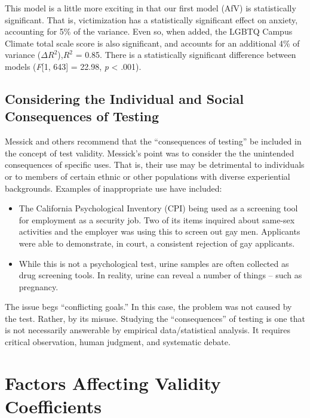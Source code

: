 \documentclass[
  english,
]{book}
\providecommand{\tightlist}{%
  \setlength{\itemsep}{0pt}\setlength{\parskip}{0pt}}
\begin{document}
This model is a little more exciting in that our first model (AfV) is statistically significant. That is, victimization has a statistically significant effect on anxiety, accounting for 5\% of the variance. Even so, when added, the LGBTQ Campus Climate total scale score is also significant, and accounts for an additional 4\% of variance (\(\Delta{R^2}\)),\(R^2\) = 0.85. There is a statistically significant difference between models (\emph{F}{[}1, 643{]} = 22.98, \emph{p} \textless{} .001).

\hypertarget{considering-the-individual-and-social-consequences-of-testing}{%
\subsection{Considering the Individual and Social Consequences of Testing}\label{considering-the-individual-and-social-consequences-of-testing}}

Messick \citep{messick_consequences_2000} and others recommend that the ``consequences of testing'' be included in the concept of test validity. Messick's point was to consider the the unintended consequences of specific uses. That is, their use may be detrimental to individuals or to members of certain ethnic or other populations with diverse experiential backgrounds. Examples of inappropriate use have included:

\begin{itemize}
\tightlist
\item
  The California Psychological Inventory (CPI) being used as a screening tool for employment as a security job. Two of its items inquired about same-sex activities and the employer was using this to screen out gay men. Applicants were able to demonstrate, in court, a consistent rejection of gay applicants.
\item
  While this is not a psychological test, urine samples are often collected as drug screening tools. In reality, urine can reveal a number of things -- such as pregnancy.
\end{itemize}

The issue begs ``conflicting goals.'' In this case, the problem was not caused by the test. Rather, by its misuse. Studying the ``consequences'' of testing is one that is not necessarily answerable by empirical data/statistical analysis. It requires critical observation, human judgment, and systematic debate.

\hypertarget{factors-affecting-validity-coefficients}{%
\section{Factors Affecting Validity Coefficients}\label{factors-affecting-validity-coefficients}}
\end{document}
